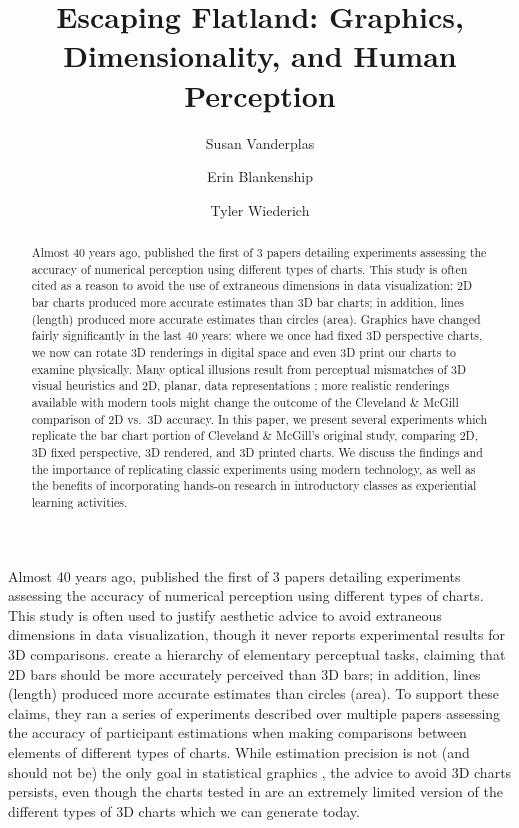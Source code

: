 \documentclass[runningheads
]{llncs}
\title{Escaping Flatland: Graphics, Dimensionality, and Human
Perception}
\author{%
Susan Vanderplas\orcidID{0000-0002-3803-0972}  \and Erin
Blankenship\orcidID{0000-0002-9132-6932}  \and Tyler
Wiederich\orcidID{0009-0006-8131-5822} %
} %
\date{}
\institute{Statistics Department, University of Nebraska Lincoln\\340
Hardin Hall North Wing, 3310 Holdrege St., Lincoln, NE, USA,
68503 \email{susan.vanderplas@unl.edu}}
\begin{document}
\maketitle
\begin{abstract}
Almost 40 years ago, \textcite{clevelandGraphicalPerceptionTheory1984}
published the first of 3 papers detailing experiments assessing the
accuracy of numerical perception using different types of charts. This
study is often cited as a reason to avoid the use of extraneous
dimensions in data visualization: 2D bar charts produced more accurate
estimates than 3D bar charts; in addition, lines (length) produced more
accurate estimates than circles (area). Graphics have changed fairly
significantly in the last 40 years: where we once had fixed 3D
perspective charts, we now can rotate 3D renderings in digital space and
even 3D print our charts to examine physically. Many optical illusions
result from perceptual mismatches of 3D visual heuristics and 2D,
planar, data representations
\autocite{vanderplasSignsSineIllusion2015,daySineIllusion1991,carswell1991graphing,fischer2000irrelevant,zacksReadingBarGraphs1998a};
more realistic renderings available with modern tools might change the
outcome of the Cleveland \& McGill comparison of 2D vs.~3D accuracy. In
this paper, we present several experiments which replicate the bar chart
portion of Cleveland \& McGill's original study, comparing 2D, 3D fixed
perspective, 3D rendered, and 3D printed charts. We discuss the findings
and the importance of replicating classic experiments using modern
technology, as well as the benefits of incorporating hands-on research
in introductory classes as experiential learning activities.
\end{abstract}
Almost 40 years ago, \citeauthor{clevelandGraphicalPerceptionTheory1984}
published the first of 3 papers detailing experiments assessing the
accuracy of numerical perception using different types of charts. This
study is often used to justify aesthetic advice
\autocite{tufteVisualDisplayQuantitative2001,wainerHowDisplayData1984,kosslynGraphicsHumanInformation1985,kosslynGraphDesignEye2006,wainerPicturingUncertainWorld2009}
to avoid extraneous dimensions in data visualization, though it never
reports experimental results for 3D comparisons.
\textcite{clevelandGraphicalPerceptionTheory1984} create a hierarchy of
elementary perceptual tasks, claiming that 2D bars should be more
accurately perceived than 3D bars; in addition, lines (length) produced
more accurate estimates than circles (area). To support these claims,
they ran a series of experiments described over multiple papers
\autocite{clevelandGraphicalPerceptionTheory1984,clevelandGraphicalPerceptionGraphical1985,clevelandGraphicalPerceptionVisual1987}
assessing the accuracy of participant estimations when making
comparisons between elements of different types of charts. While
estimation precision is not (and should not be) the only goal in
statistical graphics \autocite{bertiniWhyShouldnAll2020}, the advice to
avoid 3D charts persists, even though the charts tested in
\textcite{clevelandGraphicalPerceptionTheory1984} are an extremely
limited version of the different types of 3D charts which we can
generate today.
\end{document}

